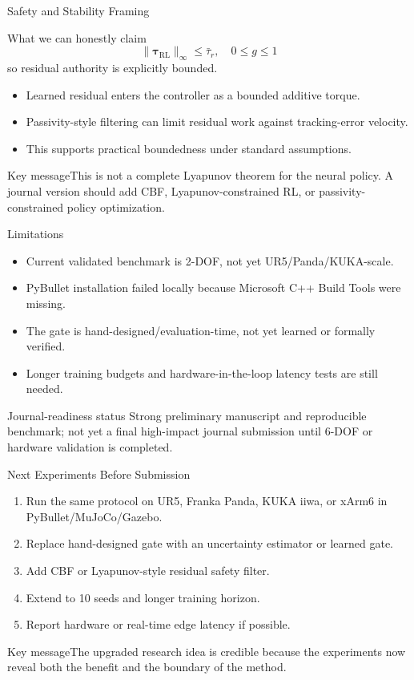 \documentclass[aspectratio=169,10pt]{beamer}
\newcommand{\keyclaim}[1]{\begin{block}{Key message}#1\end{block}}
\begin{document}
\begin{frame}{Safety and Stability Framing}
  \begin{block}{What we can honestly claim}
    \[
      \|\bm{\tau}_{\mathrm{RL}}\|_\infty \leq \bar{\tau}_r,\quad 0\leq g\leq1
    \]
    so residual authority is explicitly bounded.
  \end{block}
  \begin{itemize}
    \item Learned residual enters the controller as a bounded additive torque.
    \item Passivity-style filtering can limit residual work against tracking-error velocity.
    \item This supports practical boundedness under standard assumptions.
  \end{itemize}
  \vfill
  \keyclaim{This is not a complete Lyapunov theorem for the neural policy. A journal version should add CBF, Lyapunov-constrained RL, or passivity-constrained policy optimization.}
\end{frame}

\begin{frame}{Limitations}
  \begin{itemize}
    \item Current validated benchmark is 2-DOF, not yet UR5/Panda/KUKA-scale.
    \item PyBullet installation failed locally because Microsoft C++ Build Tools were missing.
    \item The gate is hand-designed/evaluation-time, not yet learned or formally verified.
    \item Longer training budgets and hardware-in-the-loop latency tests are still needed.
  \end{itemize}
  \vfill
  \begin{block}{Journal-readiness status}
    Strong preliminary manuscript and reproducible benchmark; not yet a final high-impact journal submission until 6-DOF or hardware validation is completed.
  \end{block}
\end{frame}

\begin{frame}{Next Experiments Before Submission}
  \begin{enumerate}
    \item Run the same protocol on UR5, Franka Panda, KUKA iiwa, or xArm6 in PyBullet/MuJoCo/Gazebo.
    \item Replace hand-designed gate with an uncertainty estimator or learned gate.
    \item Add CBF or Lyapunov-style residual safety filter.
    \item Extend to 10 seeds and longer training horizon.
    \item Report hardware or real-time edge latency if possible.
  \end{enumerate}
  \vfill
  \keyclaim{The upgraded research idea is credible because the experiments now reveal both the benefit and the boundary of the method.}
\end{frame}
\end{document}
